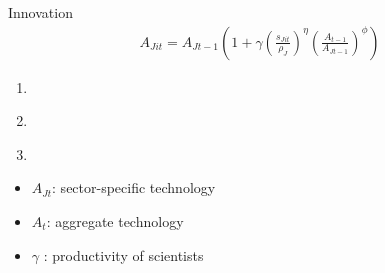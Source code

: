 \documentclass[11pt,aspectratio=169]{beamer}
\begin{document}


\begin{frame}{Innovation}
	\pause
	\vspace{-5mm}
	\large
	\begin{align*}
		A_{Jit}={A_{Jt-1}}\left(1+\gamma\left(\frac{s_{Jit}}{\rho_J}\right)^\eta\left(\frac{A_{t-1}}{A_{Jt-1}}\right)^\phi\right)
	\end{align*}
	\normalsize
	\begin{enumerate}
		\item[] \ %
	\item[] \  %
	\item[] \  %
\end{enumerate}
\small
\vspace{4mm}
\hspace{-2mm}
\begin{minipage}[t!]{0.43\textwidth}
	\vspace{0mm}
	\begin{itemize}
		\item[] $A_{Jt}$: sector-specific technology
		\vspace{-2mm}		
		\item[] $A_t$: aggregate technology
		\vspace{-2mm}
		\item[] $\gamma$ : productivity of scientists
	\end{itemize}

\end{minipage}
\end{frame}
\end{document}
